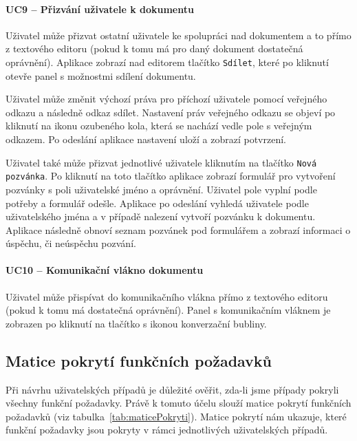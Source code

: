 \paragraph{UC9 -- Přizvání uživatele k dokumentu}

Uživatel může přizvat ostatní uživatele ke spolupráci nad dokumentem a to přímo z textového editoru (pokud k tomu má pro daný dokument dostatečná oprávnění).
Aplikace zobrazí nad editorem tlačítko \texttt{Sdílet}, které po kliknutí otevře panel s možnostmi sdílení dokumentu.

Uživatel může změnit výchozí práva pro příchozí uživatele pomocí veřejného odkazu a následně odkaz sdílet.
Nastavení práv veřejného odkazu se objeví po kliknutí na ikonu ozubeného kola, která se nachází vedle pole s veřejným odkazem.
Po odeslání aplikace nastavení uloží a zobrazí potvrzení.

Uživatel také může přizvat jednotlivé uživatele kliknutím na tlačítko \texttt{Nová pozvánka}.
Po kliknutí na toto tlačítko aplikace zobrazí formulář pro vytvoření pozvánky s poli uživatelské jméno a oprávnění.
Uživatel pole vyplní podle potřeby a formulář odešle.
Aplikace po odeslání vyhledá uživatele podle uživatelského jména a v případě nalezení vytvoří pozvánku k dokumentu.
Aplikace následně obnoví seznam pozvánek pod formulářem a zobrazí informaci o úspěchu, či neúspěchu pozvání.

\paragraph{UC10 -- Komunikační vlákno dokumentu}

Uživatel může přispívat do komunikačního vlákna přímo z textového editoru (pokud k tomu má dostatečná oprávnění).
Panel s komunikačním vláknem je zobrazen po kliknutí na tlačítko s ikonou konverzační bubliny.

\subsection{Matice pokrytí funkčních požadavků}\label{subsec:maticePokrytíFunkčníchPožadavků}

Při návrhu uživatelských případů je důležité ověřit, zda-li jsme případy pokryli všechny funkční požadavky.
Právě k tomuto účelu slouží matice pokrytí funkčních požadavků (viz tabulka~\ref{tab:maticePokryti}).
Matice pokrytí nám ukazuje, které funkční požadavky jsou pokryty v rámci jednotlivých uživatelských případů.

